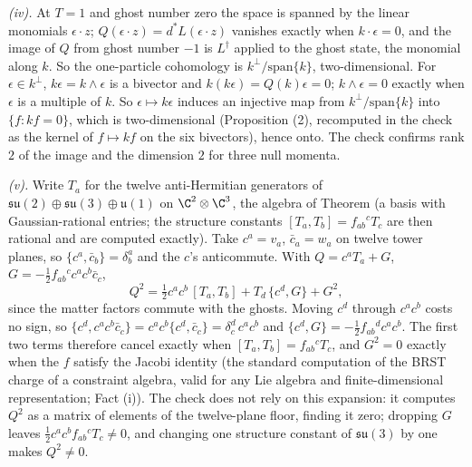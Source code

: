 \emph{(iv).} At $T = 1$ and ghost number zero the space is spanned by the linear monomials $\epsilon\cdot z$; $Q(\epsilon\cdot z) = d^{*}L(\epsilon\cdot z)$ vanishes exactly when $k\cdot\epsilon = 0$, and the image of $Q$ from ghost number $-1$ is $L^{\dagger}$ applied to the ghost state, the monomial along $k$. So the one-particle cohomology is $k^{\perp}/\mathrm{span}\{k\}$, two-dimensional. For $\epsilon \in k^{\perp}$, $k\epsilon = k\wedge\epsilon$ is a bivector and $k(k\epsilon) = Q(k)\epsilon = 0$; $k\wedge\epsilon = 0$ exactly when $\epsilon$ is a multiple of $k$. So $\epsilon \mapsto k\epsilon$ induces an injective map from $k^{\perp}/\mathrm{span}\{k\}$ into $\{f : kf = 0\}$, which is two-dimensional (Proposition (2), recomputed in the check as the kernel of $f \mapsto kf$ on the six bivectors), hence onto. The check confirms rank $2$ of the image and the dimension $2$ for three null momenta.

\emph{(v).} Write $T_a$ for the twelve anti-Hermitian generators of $\mathfrak{su}(2) \oplus \mathfrak{su}(3) \oplus \mathfrak{u}(1)$ on $\C^{2} \otimes \C^{3}$, the algebra of Theorem  (a basis with Gaussian-rational entries; the structure constants $[T_a, T_b] = f_{ab}{}^{c}T_c$ are then rational and are computed exactly). Take $c^a = v_a$, $\bar c_a = w_a$ on twelve tower planes, so $\{c^a, \bar c_b\} = \delta^a_b$ and the $c$'s anticommute. With $Q = c^aT_a + G$, $G = -\tfrac12 f_{ab}{}^{c}c^ac^b\bar c_c$,
\[
Q^2 = \tfrac12 c^ac^b\,[T_a, T_b] + T_d\,\{c^d, G\} + G^2 ,
\]
since the matter factors commute with the ghosts. Moving $c^d$ through $c^ac^b$ costs no sign, so $\{c^d, c^ac^b\bar c_c\} = c^ac^b\{c^d, \bar c_c\} = \delta^d_c\,c^ac^b$ and $\{c^d, G\} = -\tfrac12 f_{ab}{}^{d}c^ac^b$. The first two terms therefore cancel exactly when $[T_a, T_b] = f_{ab}{}^{c}T_c$, and $G^2 = 0$ exactly when the $f$ satisfy the Jacobi identity (the standard computation of the BRST charge of a constraint algebra, valid for any Lie algebra and finite-dimensional representation; Fact (i)). The check does not rely on this expansion: it computes $Q^2$ as a matrix of elements of the twelve-plane floor, finding it zero; dropping $G$ leaves $\tfrac12 c^ac^bf_{ab}{}^{c}T_c \neq 0$, and changing one structure constant of $\mathfrak{su}(3)$ by one makes $Q^2 \neq 0$.

